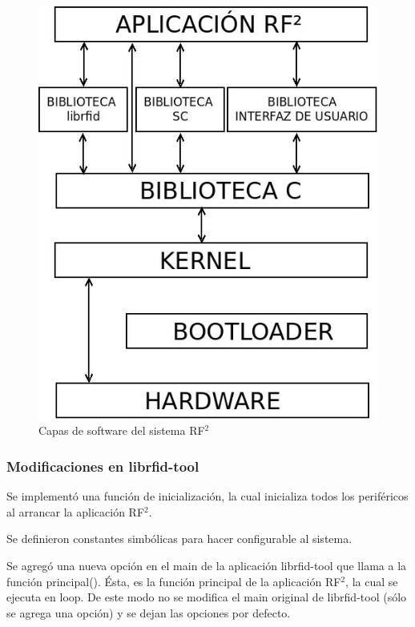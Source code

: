 \documentclass[%
        final,
        notitlepage,
        narroweqnarray,
        inline,
        ]{ieee}
\begin{document}
\begin{figure}[t]
\centering
  \begin{center}
  \includegraphics[scale=.35]{../docs/Imagenes/SW.jpg} 
  \end{center}
  \caption{Capas de software del sistema RF${^{2}}$}\label{Fig:SW} 
\end{figure}

\bigskip
\subsubsection*{Modificaciones en librfid-tool}

Se implementó una función de inicialización, la cual inicializa todos los periféricos al arrancar la aplicación RF$^{2}$.

Se definieron constantes simbólicas para hacer configurable al sistema. 

Se agregó una nueva opción en el main de la aplicación librfid-tool que llama a la función principal(). Ésta, es la función principal de la aplicación RF$^{2}$, la cual se ejecuta en loop.
De este modo no se modifica el main original de librfid-tool (sólo se agrega una opción) y se dejan las opciones por defecto.
\end{document}
